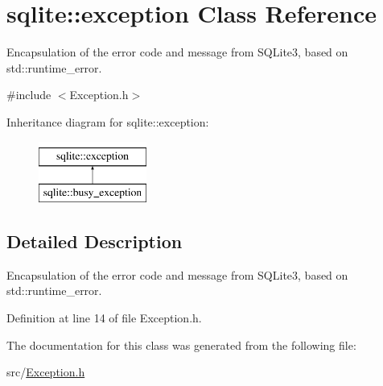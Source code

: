\hypertarget{a00006}{\section{sqlite\-:\-:exception Class Reference}
\label{a00006}
}


Encapsulation of the error code and message from S\-Q\-Lite3, based on std\-::runtime\-\_\-error.  




{\ttfamily \#include $<$Exception.\-h$>$}

Inheritance diagram for sqlite\-:\-:exception\-:\begin{figure}[H]
\begin{center}
\leavevmode
\includegraphics[height=2.000000cm]{a00006}
\end{center}
\end{figure}


\subsection{Detailed Description}
Encapsulation of the error code and message from S\-Q\-Lite3, based on std\-::runtime\-\_\-error. 



Definition at line 14 of file Exception.\-h.



The documentation for this class was generated from the following file\-:\begin{DoxyCompactItemize}
\item 
src/\hyperlink{a00024}{Exception.\-h}\end{DoxyCompactItemize}
